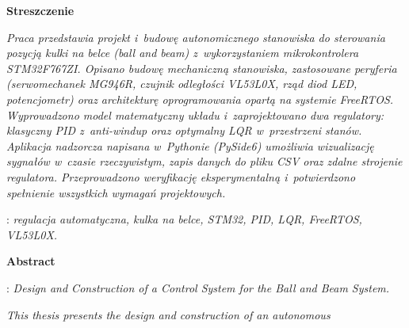 \documentclass[12pt, a4paper]{report} %
\begin{document}
\begin{titlepage}
    \newpage\thispagestyle{empty}
    \vspace*{2\baselineskip}
    \begin{center}
	{\large\bfseries Streszczenie}\par\bigskip
    \end{center}

    {\itshape
    Praca przedstawia projekt i~budowę autonomicznego stanowiska do sterowania
    pozycją kulki na belce (\textit{ball and beam}) z~wykorzystaniem mikrokontrolera
    STM32F767ZI.
    Opisano budowę mechaniczną stanowiska, zastosowane peryferia (serwomechanek
    MG946R, czujnik odległości VL53L0X, rząd diod LED, potencjometr) oraz
    architekturę oprogramowania opartą na systemie FreeRTOS.
    Wyprowadzono model matematyczny układu i~zaprojektowano dwa regulatory:
    klasyczny PID z~anti-windup oraz optymalny LQR w~przestrzeni stanów.
    Aplikacja nadzorcza napisana w~Pythonie (PySide6) umożliwia wizualizację
    sygnałów w~czasie rzeczywistym, zapis danych do pliku CSV oraz zdalne
    strojenie regulatora.
    Przeprowadzono weryfikację eksperymentalną i~potwierdzono spełnienie
    wszystkich wymagań projektowych.
    }
    \vspace*{1\baselineskip}

    : {\itshape regulacja automatyczna, kulka na belce,
    STM32, PID, LQR, FreeRTOS, VL53L0X.}
    \par
    \vspace{4\baselineskip}

    \begin{center}
	{\large\bfseries Abstract}\par\bigskip
    \end{center}
    : {\itshape Design and Construction of a Control System for the Ball and Beam System.}\par
    \vspace*{1\baselineskip}
    {\itshape
    This thesis presents the design and construction of an autonomous }
\end{titlepage}
\end{document}
